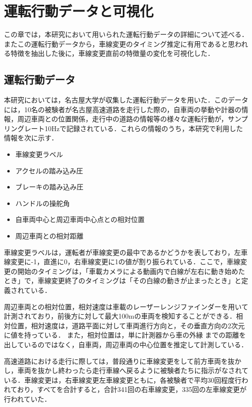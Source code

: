 \chapter{運転行動データと可視化}
この章では，本研究において用いられた運転行動データの詳細について述べる．またこの運転行動データから，車線変更のタイミング推定に有用であると思われる特徴を抽出した後に，車線変更直前の特徴量の変化を可視化した．
\section{運転行動データ}
本研究においては，名古屋大学が収集した運転行動データを用いた．このデータには，10名の被験者が名古屋高速道路を走行した際の，自車両の挙動や計器の情報，周辺車両との位置関係，走行中の道路の情報等の様々な運転行動が，サンプリングレート10Hzで記録されている．これらの情報のうち，本研究で利用した情報を次に示す．
\begin{itemize}
 \item 車線変更ラベル
 \item アクセルの踏み込み圧
 \item ブレーキの踏み込み圧
 \item ハンドルの操舵角
 \item 自車両中心と周辺車両中心点との相対位置
 \item 周辺車両との相対距離
\end{itemize}
\par
車線変更ラベルは，運転者が車線変更の最中であるかどうかを表しており，左車線変更に-1，直進に0，右車線変更に1の値が割り振られている．ここで，車線変更の開始のタイミングは，「車載カメラによる動画内で白線が左右に動き始めたとき」で，車線変更終了のタイミングは「その白線の動きが止まったとき」と定義されている．
\par
周辺車両との相対位置，相対速度は車載のレーザーレンジファインダーを用いて計測されており，前後方に対して最大100mの車両を検知することができる．相対位置，相対速度は，道路平面に対して車両進行方向と，その垂直方向の2次元に値を持っている．%
また，相対位置は，単に計測器から車の外縁%
までの距離を出しているのではなく，自車両，周辺車両の中心位置を推定して計測している．
\par
高速道路における走行に際しては，普段通りに車線変更をして前方車両を抜かし，車両を抜かし終わったら走行車線へ戻るように被験者たちに指示がなされている．車線変更は，右車線変更左車線変更ともに，各被験者で平均30回程度行われており，すべてを合計すると，合計341回の右車線変更，335回の左車線変更が行われていた．
